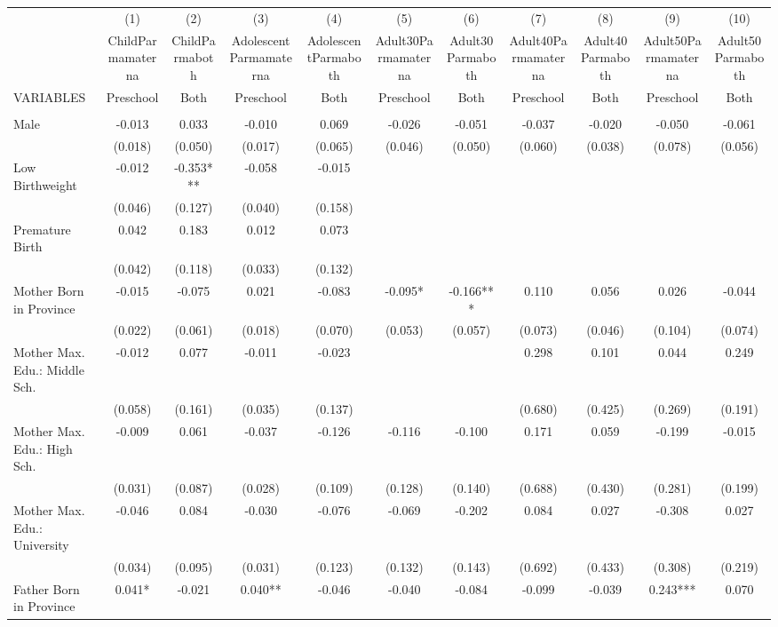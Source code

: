 \begin{tabular}{lcccccccccc} \hline
 & (1) & (2) & (3) & (4) & (5) & (6) & (7) & (8) & (9) & (10) \\
 & ChildParmamaterna & ChildParmaboth & AdolescentParmamaterna & AdolescentParmaboth & Adult30Parmamaterna & Adult30Parmaboth & Adult40Parmamaterna & Adult40Parmaboth & Adult50Parmamaterna & Adult50Parmaboth \\
VARIABLES & Preschool & Both & Preschool & Both & Preschool & Both & Preschool & Both & Preschool & Both \\ \hline
 &  &  &  &  &  &  &  &  &  &  \\
Male & -0.013 & 0.033 & -0.010 & 0.069 & -0.026 & -0.051 & -0.037 & -0.020 & -0.050 & -0.061 \\
 & (0.018) & (0.050) & (0.017) & (0.065) & (0.046) & (0.050) & (0.060) & (0.038) & (0.078) & (0.056) \\
Low Birthweight & -0.012 & -0.353*** & -0.058 & -0.015 &  &  &  &  &  &  \\
 & (0.046) & (0.127) & (0.040) & (0.158) &  &  &  &  &  &  \\
Premature Birth & 0.042 & 0.183 & 0.012 & 0.073 &  &  &  &  &  &  \\
 & (0.042) & (0.118) & (0.033) & (0.132) &  &  &  &  &  &  \\
Mother Born in Province & -0.015 & -0.075 & 0.021 & -0.083 & -0.095* & -0.166*** & 0.110 & 0.056 & 0.026 & -0.044 \\
 & (0.022) & (0.061) & (0.018) & (0.070) & (0.053) & (0.057) & (0.073) & (0.046) & (0.104) & (0.074) \\
Mother Max. Edu.: Middle Sch. & -0.012 & 0.077 & -0.011 & -0.023 &  &  & 0.298 & 0.101 & 0.044 & 0.249 \\
 & (0.058) & (0.161) & (0.035) & (0.137) &  &  & (0.680) & (0.425) & (0.269) & (0.191) \\
Mother Max. Edu.: High Sch. & -0.009 & 0.061 & -0.037 & -0.126 & -0.116 & -0.100 & 0.171 & 0.059 & -0.199 & -0.015 \\
 & (0.031) & (0.087) & (0.028) & (0.109) & (0.128) & (0.140) & (0.688) & (0.430) & (0.281) & (0.199) \\
Mother Max. Edu.: University & -0.046 & 0.084 & -0.030 & -0.076 & -0.069 & -0.202 & 0.084 & 0.027 & -0.308 & 0.027 \\
 & (0.034) & (0.095) & (0.031) & (0.123) & (0.132) & (0.143) & (0.692) & (0.433) & (0.308) & (0.219) \\
Father Born in Province & 0.041* & -0.021 & 0.040** & -0.046 & -0.040 & -0.084 & -0.099 & -0.039 & 0.243*** & 0.070 \\

\end{tabular}

